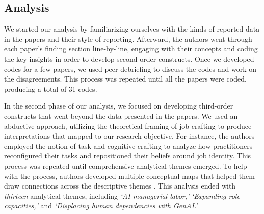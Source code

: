 \subsection{Analysis}
We started our analysis by familiarizing ourselves with the kinds of reported data in the papers and their style of reporting. 
Afterward, the authors went through each paper's finding section line-by-line, engaging with their concepts and coding the key insights in order to develop second-order constructs. Once we developed codes for a few papers, we used peer debriefing \cite{creswell} to discuss the codes and work on the disagreements. This process was repeated until all the papers were coded, producing a total of 31 codes. 

In the second phase of our analysis, we focused on developing third-order constructs that went beyond the data presented in the papers. We used an abductive approach, utilizing the theoretical framing of job crafting \cite{Wrzesniewski_2001} to produce interpretations that mapped to our research objective. For instance, the authors employed the notion of task and cognitive crafting to analyze how practitioners reconfigured their tasks and repositioned their beliefs around job identity. This process was repeated until comprehensive analytical themes emerged. To help with the process, authors developed multiple conceptual maps that helped them draw connections across the descriptive themes \cite{Miles2020}. This analysis ended with \textit{thirteen} analytical themes, including \textit{`AI managerial labor,'} \textit{`Expanding role capacities,'} and \textit{`Displacing human dependencies with GenAI.'} 
 


